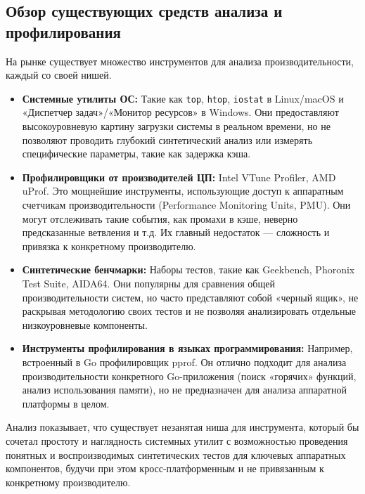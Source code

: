 \subsection{Обзор существующих средств анализа и профилирования}

На рынке существует множество инструментов для анализа производительности, каждый со своей нишей.

\begin{itemize}
    \item \textbf{Системные утилиты ОС:} Такие как \texttt{top}, \texttt{htop}, \texttt{iostat} в Linux/macOS и «Диспетчер задач»/«Монитор ресурсов» в Windows. Они предоставляют высокоуровневую картину загрузки системы в реальном времени, но не позволяют проводить глубокий синтетический анализ или измерять специфические параметры, такие как задержка кэша.
    \item \textbf{Профилировщики от производителей ЦП:} Intel VTune Profiler, AMD uProf. Это мощнейшие инструменты, использующие доступ к аппаратным счетчикам производительности (Performance Monitoring Units, PMU). Они могут отслеживать такие события, как промахи в кэше, неверно предсказанные ветвления и т.д. Их главный недостаток — сложность и привязка к конкретному производителю.
    \item \textbf{Синтетические бенчмарки:} Наборы тестов, такие как Geekbench, Phoronix Test Suite, AIDA64. Они популярны для сравнения общей производительности систем, но часто представляют собой «черный ящик», не раскрывая методологию своих тестов и не позволяя анализировать отдельные низкоуровневые компоненты.
    \item \textbf{Инструменты профилирования в языках программирования:} Например, встроенный в Go профилировщик pprof. Он отлично подходит для анализа производительности конкретного Go-приложения (поиск «горячих» функций, анализ использования памяти), но не предназначен для анализа аппаратной платформы в целом.
\end{itemize}

Анализ показывает, что существует незанятая ниша для инструмента, который бы сочетал простоту и наглядность системных утилит с возможностью проведения понятных и воспроизводимых синтетических тестов для ключевых аппаратных компонентов, будучи при этом кросс-платформенным и не привязанным к конкретному производителю.

